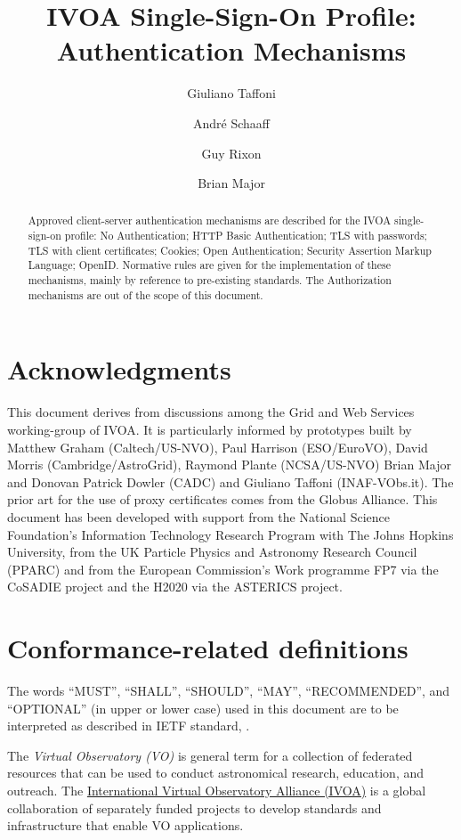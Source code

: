 \documentclass[11pt,a4paper]{ivoa}
\title{IVOA Single-Sign-On Profile: Authentication Mechanisms}
\author{Giuliano Taffoni}
\author{Andr\'e Schaaff}
\author{Guy Rixon}
\author{Brian Major}
\begin{document}
\begin{abstract}
Approved client-server authentication mechanisms are described for the IVOA single-sign-on profile: No Authentication; HTTP Basic Authentication; TLS with passwords; TLS with client certificates; Cookies; Open Authentication; Security Assertion Markup Language; OpenID. Normative rules are given for the implementation of these mechanisms, mainly by reference to pre-existing standards. The Authorization mechanisms are out of the scope of this document.
\end{abstract}


\section*{Acknowledgments}

This document derives from discussions among the Grid and Web Services working-group of IVOA. It is particularly informed by prototypes built by Matthew Graham (Caltech/US-NVO), Paul Harrison (ESO/EuroVO), David Morris (Cambridge/AstroGrid), Raymond Plante (NCSA/US-NVO) Brian Major and  Donovan Patrick Dowler (CADC) and Giuliano Taffoni (INAF-VObs.it). 
The prior art for the use of proxy certificates comes from the Globus Alliance. 
This document has been developed with support from the National Science Foundation's Information Technology Research Program  with The Johns Hopkins University, from the UK Particle Physics and Astronomy Research Council (PPARC) and from the European Commission's Work programme FP7 via the  CoSADIE project and the H2020 via the ASTERICS project.


\section*{Conformance-related definitions}
The words ``MUST'', ``SHALL'', ``SHOULD'', ``MAY'', ``RECOMMENDED'', and
``OPTIONAL'' (in upper or lower case) used in this document are to be
interpreted as described in IETF standard, \citet{std:RFC2119}.

The \emph{Virtual Observatory (VO)} is
general term for a collection of federated resources that can be used
to conduct astronomical research, education, and outreach.
The \href{http://www.ivoa.net}{International
Virtual Observatory Alliance (IVOA)} is a global
collaboration of separately funded projects to develop standards and
infrastructure that enable VO applications.
\end{document}
